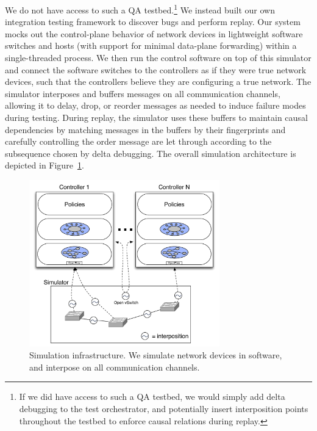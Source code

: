 We do not have access to such a QA testbed.\footnote{If we did have access to
such a QA testbed, we would simply add delta debugging to the test
orchestrator, and potentially insert interposition points throughout the
testbed to enforce causal relations during replay.}
We instead built our own integration testing framework to discover bugs and
perform replay. Our system mocks out the control-plane
behavior of network devices in lightweight software switches and hosts (with
support for minimal data-plane forwarding)
within a single-threaded process. We then run the control software on
top of this simulator and connect the software switches to the controllers as if they were true
network devices, such that the controllers believe they are configuring a true
network. The simulator interposes and buffers messages on all communication
channels, allowing it to delay, drop, or reorder
messages as needed to induce failure modes during testing. During
replay, the simulator uses these buffers to maintain causal dependencies by
matching messages in the buffers by their fingerprints and carefully
controlling the order message are let through according to the subsequence chosen by
delta debugging. The overall simulation architecture is depicted in
Figure~\ref{fig:architecture}.

\begin{figure}[t]
    \includegraphics[width=3.25in]{../diagrams/architecture/Debugger_Architecture.pdf}
    \caption[]{\label{fig:architecture} Simulation infrastructure. We simulate
    network devices in software, and interpose on all communication
    channels.}
\end{figure}

